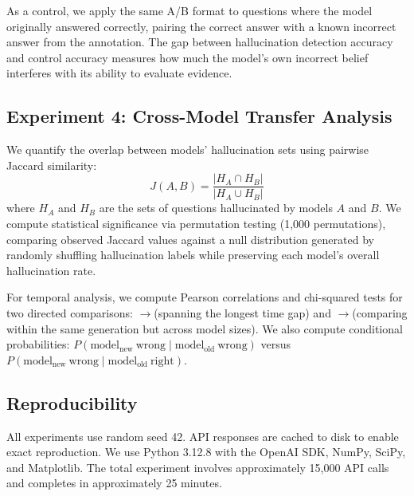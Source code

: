 As a control, we apply the same A/B format to questions where the model originally answered correctly, pairing the correct answer with a known incorrect answer from the \truthfulqa annotation.
The gap between hallucination detection accuracy and control accuracy measures how much the model's own incorrect belief interferes with its ability to evaluate evidence.

\subsection{Experiment 4: Cross-Model Transfer Analysis}
\label{sec:exp4}

We quantify the overlap between models' hallucination sets using pairwise Jaccard similarity:
\begin{equation}
    J(A, B) = \frac{|H_A \cap H_B|}{|H_A \cup H_B|}
    \label{eq:jaccard}
\end{equation}
where $H_A$ and $H_B$ are the sets of questions hallucinated by models $A$ and $B$.
We compute statistical significance via permutation testing (1,000 permutations), comparing observed Jaccard values against a null distribution generated by randomly shuffling hallucination labels while preserving each model's overall hallucination rate.

For temporal analysis, we compute Pearson correlations and chi-squared tests for two directed comparisons: \gptthreefive$\to$\gptfourone (spanning the longest time gap) and \gptfouromini$\to$\gptfouro (comparing within the same generation but across model sizes).
We also compute conditional probabilities: $P(\text{model}_\text{new}\ \text{wrong} \mid \text{model}_\text{old}\ \text{wrong})$ versus $P(\text{model}_\text{new}\ \text{wrong} \mid \text{model}_\text{old}\ \text{right})$.

\subsection{Reproducibility}
\label{sec:reproducibility}

All experiments use random seed 42.
API responses are cached to disk to enable exact reproduction.
We use Python 3.12.8 with the OpenAI SDK, NumPy, SciPy, and Matplotlib.
The total experiment involves approximately 15,000 API calls and completes in approximately 25 minutes.
